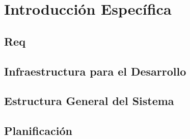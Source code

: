 \chapter{Introducción Específica}\label{Chapter2}

\section{Req}

\section{Infraestructura para el Desarrollo}

\section{Estructura General del Sistema}

\section{{Planificación}}
